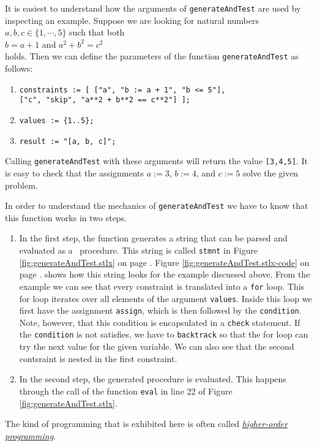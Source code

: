 It is easiest to understand how  the arguments of \texttt{generateAndTest} are used by inspecting
an example.  Suppose we are looking for natural numbers $a,b,c \in \{1, \cdots, 5\}$ such that both
\\[0.2cm]
\hspace*{1.3cm}
$b = a + 1$ \quad and \quad $a^2 + b^2 = c^2$
\\[0.2cm]
holds.  Then we can define the parameters of the function \texttt{generateAndTest} as follows:
\begin{enumerate}
\item \texttt{constraints := [ ["a", "b := a + 1", "b <= 5"],} \\
      \hspace*{3.0cm}
      \texttt{["c", "skip", "a**2 + b**2 == c**2"] ];}
\item \texttt{values := \{1..5\};}
\item \texttt{result := "[a, b, c]";}
\end{enumerate}
Calling \texttt{generateAndTest} with these arguments will return the value \texttt{[3,4,5]}.  It is
easy to check that the assignments $a := 3$, $b := 4$, and $c := 5$ solve the given problem.

In order to understand the mechanics of \texttt{generateAndTest} we have to know that this function
works in two steps.  
\begin{enumerate}
\item In the first step, the function generates a string that can be parsed and
      evaluated as a \setlx\ procedure.  This string is called \texttt{stmnt} in Figure
      \ref{fig:generateAndTest.stlx} on page \pageref{fig:generateAndTest.stlx}.   Figure
      \ref{fig:generateAndTest.stlx-code} on page \pageref{fig:generateAndTest.stlx-code}. shows how this
      string looks for the example discussed above.   From the example we can see that every constraint is
      translated into a \texttt{for} loop.  This for loop iterates over all elements of the argument
      \texttt{values}.  Inside this loop we first have the assignment \texttt{assign}, which is then followed by the
      \texttt{condition}.  Note, however, that this condition is encapsulated in a \texttt{check}
      statement.  If the \texttt{condition} is not satisfies, we have to \texttt{backtrack} so that the
      for loop can try the next value for the given variable.  We can also see that the second contsraint
      is nested in the first constraint.
\item In the second step, the generated procedure is evaluated.  This happens through the call of
      the function \texttt{eval} in line 22 of Figure \ref{fig:generateAndTest.stlx}.
\end{enumerate}
The kind of programming that is exhibited here is often called 
\href{https://en.wikipedia.org/wiki/Higher-order_programming}{\emph{higher-order programming}}.

